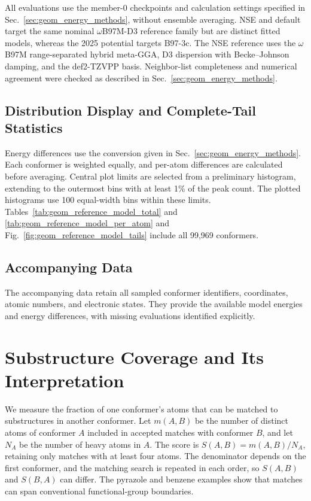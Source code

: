 \documentclass[%
 preprint,
superscriptaddress,
 amsmath,amssymb,
 aip,
 jcp,
]{revtex4-2}
\begin{document}
All evaluations use the member-0 checkpoints and calculation settings specified in Sec.~\ref{sec:geom_energy_methods}, without ensemble averaging.
NSE and default target the same nominal $\omega$B97M-D3 reference family but are distinct fitted models, whereas the 2025 potential targets B97-3c.\cite{AIMNet2-NSE,AIMNet2,AIMNetCentralModelGuide}
The NSE reference uses the $\omega$B97M range-separated hybrid meta-GGA, D3 dispersion with Becke--Johnson damping, and the def2-TZVPP basis.
Neighbor-list completeness and numerical agreement were checked as described in Sec.~\ref{sec:geom_energy_methods}.

\subsection{Distribution Display and Complete-Tail Statistics}

Energy differences use the conversion given in Sec.~\ref{sec:geom_energy_methods}.
Each conformer is weighted equally, and per-atom differences are calculated before averaging.
Central plot limits are selected from a preliminary histogram, extending to the outermost bins with at least 1\% of the peak count.
The plotted histograms use 100 equal-width bins within these limits.
Tables~\ref{tab:geom_reference_model_total} and \ref{tab:geom_reference_model_per_atom} and Fig.~\ref{fig:geom_reference_model_tails} include all 99,969 conformers.

\subsection{Accompanying Data}

The accompanying data retain all sampled conformer identifiers, coordinates, atomic numbers, and electronic states.
They provide the available model energies and energy differences, with missing evaluations identified explicitly.

\section{Substructure Coverage and Its Interpretation}
\label{sec:similarity_methods}

We measure the fraction of one conformer's atoms that can be matched to substructures in another conformer.
Let $m(A,B)$ be the number of distinct atoms of conformer $A$ included in accepted matches with conformer $B$, and let $N_A$ be the number of heavy atoms in $A$.
The score is $S(A,B)=m(A,B)/N_A$, retaining only matches with at least four atoms.
The denominator depends on the first conformer, and the matching search is repeated in each order, so $S(A,B)$ and $S(B,A)$ can differ.
The pyrazole and benzene examples show that matches can span conventional functional-group boundaries.
\end{document}
